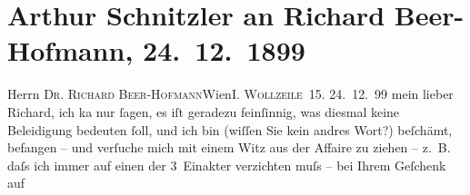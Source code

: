 

         
         \newcommand{\erwaehntePersonen}{Personen: Richard Beer-Hofmann, August Strindberg, Ludwig Wolff}
         \newcommand{\erwaehnteInstitutionen}{Institutionen: Theater in der Josefstadt}
         \newcommand{\erwaehnteOrte}{Orte: IX., Alsergrund, Theater in der Josefstadt, Wien, Wollzeile}
         \newcommand{\erwaehnteWerke}{Werke: Der grüne Kakadu – Paracelsus – Die Gefährtin. Drei Einakter, Die Gefährtin. Schauspiel in einem Akt, Die Mondscheinsonate. Komödie in einem Akt, Gläubiger}
               \section[Arthur Schnitzler an Richard Beer-Hofmann, 24. 12. 1899]{ Arthur Schnitzler an Richard Beer-Hofmann, 24. 12. 1899}\nopagebreak{}\rehead{ }\begin{ledgroupsized}[t]{13cm}\normalsize\beginnumbering \toendnotes[C]{\smallbreak\pagebreak[2]} 
\toendnotes[C]{\smallbreak}\pstart{}{\pb}Herrn \textsc{Dr. Richard
                     Beer-Hofmann}\pend{}\pstart{}Wien\pend{}\pstart{}\textsc{I. Wollzeile 15}.\pend{}{\bigskip}\pstart
           \raggedleft{}{\pb}24. 12. 99\pend
           \pstart{}mein lieber Richard,\pend\pstart
           ich ka{\geminationn} nur ſagen, es iſt geradezu feinſinnig, was
               diesmal keine Beleidigung bedeuten ſoll, und ich bin (wiſſen Sie kein andres Wort?)
               beſchämt, befangen – und verſuche mich mit einem Witz aus der Affaire zu {\pb}ziehen – z. B. daſs ich immer auf einen der 3 Einakter verzichten muſs – bei Ihrem Geſchenk auf

\end{ledgroupsized}
